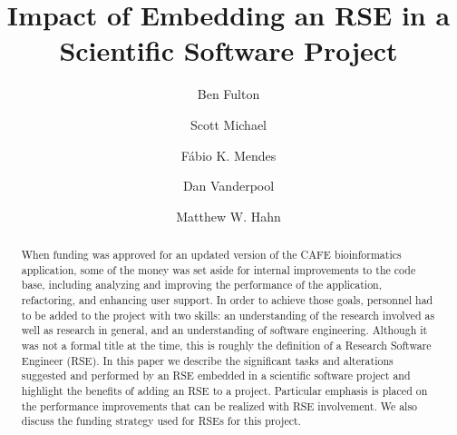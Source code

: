 \documentclass[acmtog, authorversion]{acmart}
\begin{document}
\title{Impact of Embedding an RSE in a Scientific Software Project}

\author{Ben Fulton}
\author{Scott Michael}
\authornotemark[1]

\author{Fábio K. Mendes}


\author{Dan Vanderpool}

\author{Matthew W. Hahn}

\renewcommand{\shortauthors}{Fulton and Michael, et al.}

\newif\ifdraft
\ifdraft
\newcommand{\note}[1]{ {\textcolor{blue} { ***NOTE: #1 }}}
\newcommand{\scott}[1]{ {\textcolor{red} { ***Scott: #1 }}}
\newcommand{\ben}[1]{ {\textcolor{green} {***Ben: #1}}}
\else
\newcommand{\note}[1]{ {}}
\newcommand{\scott}[1]{ {}}
\newcommand{\ben}[1]{ {}}
\fi

\begin{abstract}
 When funding was approved for an updated version of the CAFE bioinformatics application, some of the money was set aside for internal improvements to the code base, including analyzing and improving the performance of the application, refactoring, and enhancing user support. In order to achieve those goals, personnel had to be added to the project with two skills: an understanding of the research involved as well as research in general, and an understanding of software engineering. Although it was not a formal title at the time, this is roughly the definition of a Research Software Engineer (RSE). In this paper we describe the significant tasks and alterations suggested and performed by an RSE embedded in a scientific software project and highlight the benefits of adding an RSE to a project. Particular emphasis is placed on the performance improvements that can be realized with RSE involvement. We also discuss the funding strategy used for RSEs for this project. 
\end{abstract}
\end{document}

